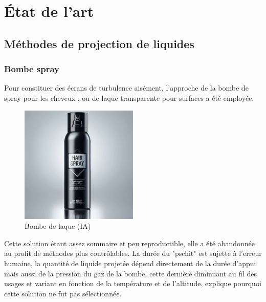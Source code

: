 \newpage

\section{État de l'art}
\subsection{Méthodes de projection de liquides}
\subsubsection{Bombe spray}
Pour constituer des écrans de turbulence aisément, l'approche de la bombe de spray pour les cheveux
, ou de laque transparente pour surfaces a été employée.
\begin{figure}[H]
    \centering
    \includegraphics[width=0.5\textwidth,trim={4cm 0 4cm 0},clip]{assets/figures/etat_art/airspray.jpeg}

    \caption{Bombe de laque (IA)}
\end{figure}
Cette solution étant assez sommaire et peu reproductible, elle a été abandonnée au profit de méthodes plus contrôlables.
La durée du "pschit" est sujette à l'erreur humaine, la quantité de liquide projetée
dépend directement de la durée d'appui mais aussi de la pression du gaz de la bombe, cette
dernière diminuant au fil des usages et variant en fonction de la température et de l'altitude,
explique pourquoi cette solution ne fut pas sélectionnée.

